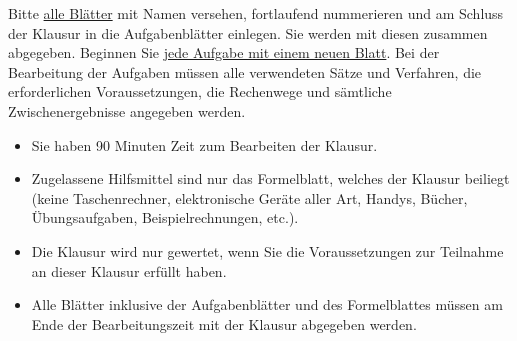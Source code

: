 \documentclass[12pt]{article}
\begin{document}
\maketitle
\thispagestyle{empty}
%
Bitte \underline{alle Bl\"atter} mit Namen versehen, fortlaufend
nummerieren und am Schluss der Klausur in die Aufgabenbl\"atter
einlegen. Sie werden mit diesen zusammen abgegeben. Beginnen Sie
\underline{jede Aufgabe mit einem neuen Blatt}. Bei der Bearbeitung
der Aufgaben m\"ussen alle verwendeten S\"atze und Verfahren, die
erforderlichen Voraussetzungen, die Rechenwege und s\"amtliche
Zwischenergebnisse angegeben werden.
%
\begin{itemize}
  \item Sie haben 90 Minuten Zeit zum Bearbeiten der Klausur.
  \item Zugelassene Hilfsmittel sind nur das Formelblatt, welches der Klausur beiliegt
  (keine Taschenrechner, elektronische Ger\"ate aller Art, Handys, B\"ucher, \"Ubungsaufgaben, Beispielrechnungen, etc.).
  \item Die Klausur wird nur gewertet, wenn Sie die Voraussetzungen zur Teilnahme an dieser
  Klausur erf\"ullt haben.
  \item Alle Bl\"atter inklusive der Aufgabenbl\"atter und des Formelblattes m\"ussen am
  Ende der Bearbeitungszeit mit der Klausur abgegeben werden.
\end{itemize}
%
\vspace{1cm}
%
%
\newpage
%
%
%
%
\end{document}
